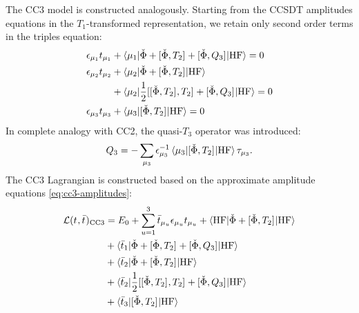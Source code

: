 The \gls{CC3} model is constructed analogously. Starting from the
\acrshort{CCSDT} amplitudes equations in the $T_1$-transformed
representation, we retain only second order terms in the triples
equation:\autocite{Christiansen1995-pv, Koch1997-nm, Helgaker2000-tz,
Smith2005-an}
\begin{subequations}\label{eq:cc3-amplitudes}
  \begin{align}
    \epsilon_{\mu_1}t_{\mu_1} &+ \braket{\mu_1 |
    \check{\Phi} + [ \check{\Phi}, T_2 ]^{}
    + [ \check{\Phi}, Q_3 ]^{}
    | \mathrm{HF}} = 0 \label{eq:cc3-singles-amplitudes} \\
    \epsilon_{\mu_2}t_{\mu_2} &+ \braket{\mu_2 |
    \check{\Phi} + [ \check{\Phi}, T_2 ]^{} | \mathrm{HF}}
    \nonumber \\
    &+ \braket{\mu_2 | \frac{1}{2}[ [ \check{\Phi}, T_2 ]^{}, T_2 ]^{}
    + [ \check{\Phi}, Q_3 ]^{}
    | \mathrm{HF}} = 0 \label{eq:cc3-doubles-amplitudes} \\
    \epsilon_{\mu_3}t_{\mu_3} &+ \braket{\mu_3 |
    [ \check{\Phi}, T_2 ]^{}
    | \mathrm{HF}} = 0 \label{eq:cc3-triples-amplitudes}
  \end{align}
\end{subequations}
In complete analogy with \acrshort{CC2}, the quasi-$T_3$ operator was introduced:
\begin{equation}
  Q_3 = - \sum_{\mu_3}
  \epsilon_{\mu_3}^{-1}\braket{\mu_3 | [ \check{\Phi}, T_2 ]^{} | \mathrm{HF}}\tau_{\mu_3}.
\end{equation}
The \acrshort{CC3} Lagrangian is constructed based on the approximate
amplitude equations
\eqref{eq:cc3-amplitudes}:\autocite{Christiansen1995-pv, Koch1997-nm,
Helgaker2000-tz, Smith2005-an}
\begin{equation}\label{eq:cc3-lagrangian}
  \begin{aligned}
  \mathcal{L}(t_{}, \bar{t}_{})_\mathrm{CC3}
  &=
  E_0
  + \sum_{u=1}^{3}\bar{t}_{\mu_u}\epsilon_{\mu_u}t_{\mu_u}
  + \braket{\mathrm{HF} | \check{\Phi} + [ \check{\Phi}, T_2 ]^{} | \mathrm{HF}} \\
  &+ \braket{\bar{t}_{1} |
  \check{\Phi} + [ \check{\Phi}, T_2 ]^{} + [ \check{\Phi}, Q_3 ]^{}
  | \mathrm{HF}} \\
  &+ \braket{\bar{t}_{2} |
  \check{\Phi} + [ \check{\Phi}, T_2 ]^{} | \mathrm{HF}} \\
  &+ \braket{\bar{t}_{2} |
  \frac{1}{2}[ [ \check{\Phi}, T_2 ]^{}, T_2 ]^{} + [ \check{\Phi}, Q_3 ]^{}
  | \mathrm{HF}} \\
  &+ \braket{\bar{t}_{3} | [ \check{\Phi}, T_2 ]^{} | \mathrm{HF}}
  \end{aligned}
\end{equation}
